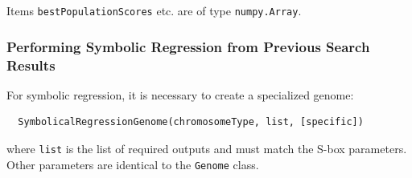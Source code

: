Items \verb|bestPopulationScores| etc. are of type \verb|numpy.Array|.

\subsubsection{Performing Symbolic Regression from Previous Search Results}
For symbolic regression, it is necessary to create a specialized genome:
\begin{verbatim}
  SymbolicalRegressionGenome(chromosomeType, list, [specific])
\end{verbatim}
where \verb|list| is the list of required outputs and must match the S-box parameters.
Other parameters are identical to the \verb|Genome| class.
